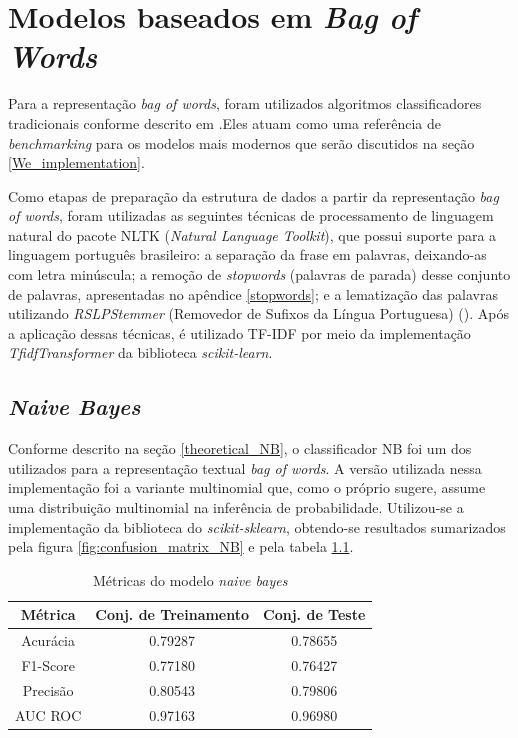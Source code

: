 \chapter{Modelos baseados em \textit{Bag of Words}} \label{bow_implementation}

Para a representação \textit{bag of words}, foram utilizados algoritmos classificadores tradicionais conforme descrito em \cite{InformationRetrievalBook}.Eles atuam como uma referência de \textit{benchmarking} para os modelos mais modernos que serão discutidos na seção \ref{We_implementation}.

Como etapas de preparação da estrutura de dados a partir da representação \textit{bag of words}, foram utilizadas as seguintes técnicas de processamento de linguagem natural do pacote NLTK (\textit{Natural Language Toolkit}), que possui suporte para a linguagem português brasileiro: a separação da frase em palavras, deixando-as com letra minúscula; a remoção de \textit{stopwords} (palavras de parada) desse conjunto de palavras, apresentadas no apêndice \ref{stopwords}; e a lematização das palavras utilizando \textit{RSLPStemmer} (Removedor de Sufixos da Língua Portuguesa) (\cite{RSLPStemmer}). Após a aplicação dessas técnicas, é utilizado TF-IDF por meio da implementação \textit{TfidfTransformer} da biblioteca \textit{scikit-learn}.

\section{\textit{Naive Bayes}}

Conforme descrito na seção \ref{theoretical_NB}, o classificador NB foi um dos utilizados para a representação textual \textit{bag of words}. A versão utilizada nessa implementação foi a variante multinomial que, como o próprio sugere, assume uma distribuição multinomial na inferência de probabilidade. Utilizou-se a implementação da biblioteca do \textit{scikit-sklearn}, obtendo-se resultados sumarizados pela figura \ref{fig:confusion_matrix_NB} e pela tabela \ref{tab:NB}.

\begin{table}[ht]
\centering
\caption{Métricas do modelo \textit{naive bayes}}
\vspace{0.5cm}
\begin{tabular}{c|c|c}
 
Métrica & Conj. de Treinamento & Conj. de Teste \\
\hline
Acurácia & 0.79287 & 0.78655 \\
F1-Score & 0.77180 & 0.76427 \\
Precisão & 0.80543 & 0.79806 \\
AUC ROC  & 0.97163 & 0.96980
\end{tabular}
\label{tab:NB}
\end{table}

